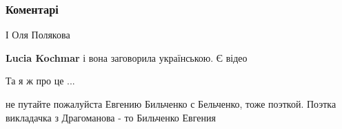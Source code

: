  
 
 
 
 
\subsubsection{Коментарі}

\begin{itemize}
 
І Оля Полякова

\begin{itemize}
 
\textbf{Lucia Kochmar} і вона заговорила українською. Є відео

 
Та я ж про це ...
\end{itemize}

 
не путайте пожалуйста Евгению Бильченко с Бельченко, тоже поэткой. Поэтка
викладачка з Драгоманова - то Бильченко Евгения

\begin{itemize}
 

\end{itemize}
\end{itemize}

